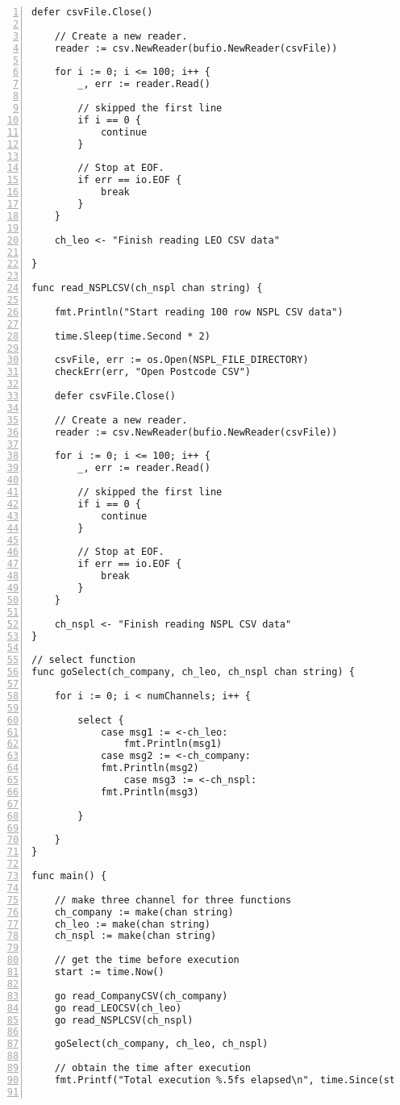 \begin{lstlisting}[breaklines, frame=single, numbers=left, caption={Golang Concurrent Program Source Code}, label=commandline-02]
	defer csvFile.Close()
	
	// Create a new reader.
	reader := csv.NewReader(bufio.NewReader(csvFile))
	
	for i := 0; i <= 100; i++ {
		_, err := reader.Read()
	
		// skipped the first line
		if i == 0 {
			continue
		}
		
		// Stop at EOF.
		if err == io.EOF {
			break
		}
	}

	ch_leo <- "Finish reading LEO CSV data"

}

func read_NSPLCSV(ch_nspl chan string) {

	fmt.Println("Start reading 100 row NSPL CSV data")
	
	time.Sleep(time.Second * 2)
	
	csvFile, err := os.Open(NSPL_FILE_DIRECTORY)
	checkErr(err, "Open Postcode CSV")
	
	defer csvFile.Close()
	
	// Create a new reader.
	reader := csv.NewReader(bufio.NewReader(csvFile))
	
	for i := 0; i <= 100; i++ {
		_, err := reader.Read()
		
		// skipped the first line
		if i == 0 {
			continue
		}
		
		// Stop at EOF.
		if err == io.EOF {
			break
		}
	}
	
	ch_nspl <- "Finish reading NSPL CSV data"
}

// select function
func goSelect(ch_company, ch_leo, ch_nspl chan string) {

	for i := 0; i < numChannels; i++ {
	
		select {
			case msg1 := <-ch_leo:
				fmt.Println(msg1)
			case msg2 := <-ch_company:
			fmt.Println(msg2)
				case msg3 := <-ch_nspl:
			fmt.Println(msg3)
			
		}
		
	}
}

func main() {

	// make three channel for three functions
	ch_company := make(chan string)
	ch_leo := make(chan string)
	ch_nspl := make(chan string)
	
	// get the time before execution
	start := time.Now()
	
	go read_CompanyCSV(ch_company)
	go read_LEOCSV(ch_leo)
	go read_NSPLCSV(ch_nspl)
	
	goSelect(ch_company, ch_leo, ch_nspl)
	
	// obtain the time after execution
	fmt.Printf("Total execution %.5fs elapsed\n", time.Since(start).Seconds())


\end{lstlisting}
